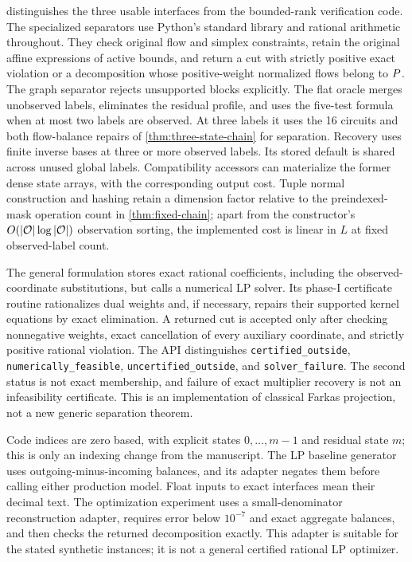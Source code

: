  distinguishes the three usable interfaces
from the bounded-rank verification code. The specialized separators use
Python's standard library and rational arithmetic throughout. They check
original flow and simplex constraints, retain the original affine expressions
of active bounds, and return a cut with strictly positive exact violation
or a decomposition whose positive-weight normalized flows belong to $P$.
The graph separator rejects unsupported blocks explicitly. The flat oracle
merges unobserved labels, eliminates the residual profile, and uses the
five-test formula when at most two labels are observed. At three labels it
uses the 16 circuits and both flow-balance repairs of
\cref{thm:three-state-chain} for separation. Recovery uses finite inverse
bases at three or more observed labels.
Its stored default is shared across unused global labels. Compatibility
accessors can materialize the former dense state arrays, with the corresponding
output cost. Tuple normal construction and hashing retain a dimension factor
relative to the preindexed-mask operation count in \cref{thm:fixed-chain};
apart from the constructor's $O(|\mathcal O|\log|\mathcal O|)$ observation sorting,
the implemented cost is linear in $L$ at fixed observed-label count.

The general formulation stores exact rational coefficients, including the
observed-coordinate substitutions, but calls a numerical LP solver.
Its phase-I certificate routine rationalizes dual weights and, if necessary,
repairs their supported kernel equations by exact elimination. A returned
cut is accepted only after checking nonnegative weights, exact cancellation
of every auxiliary coordinate, and strictly positive rational violation.
The API distinguishes \texttt{certified\_outside},
\texttt{numerically\_feasible}, \texttt{uncertified\_outside}, and
\texttt{solver\_failure}. The second status is not exact membership,
and failure of exact multiplier recovery is not an infeasibility certificate.
This is an implementation of classical Farkas projection, not a new generic
separation theorem.

Code indices are zero based, with explicit states $0,\ldots,m-1$ and
residual state $m$; this is only an indexing change from the manuscript.
The LP baseline generator uses outgoing-minus-incoming balances, and its
adapter negates them before calling either production model. Float inputs
to exact interfaces mean their decimal text. The optimization experiment
uses a small-denominator reconstruction adapter, requires error below
$10^{-7}$ and exact aggregate balances, and then checks the returned
decomposition exactly. This adapter is suitable for the stated synthetic
instances; it is not a general certified rational LP optimizer.

